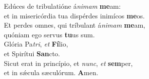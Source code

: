 \oddverse Edúces de tribulatióne á\textit{ni}\textit{mam} \textbf{me}am:~\*\\
\oddverse et in misericórdia tua dispérdes inimícos \textbf{me}os.\\
\evenverse Et perdes omnes, qui tríbulant á\textit{ni}\textit{mam} \textbf{me}am,~\*\\
\evenverse quóniam ego servus \textbf{tu}us sum.\\
\oddverse Glória Pa\textit{tri}, \textit{et} \textbf{Fí}lio,~\*\\
\oddverse et Spirítui \textbf{San}cto.\\
\evenverse Sicut erat in princípio, et \textit{nunc}, \textit{et} \textbf{sem}per,~\*\\
\evenverse et in sǽcula sæculórum. \textbf{A}men.\\
